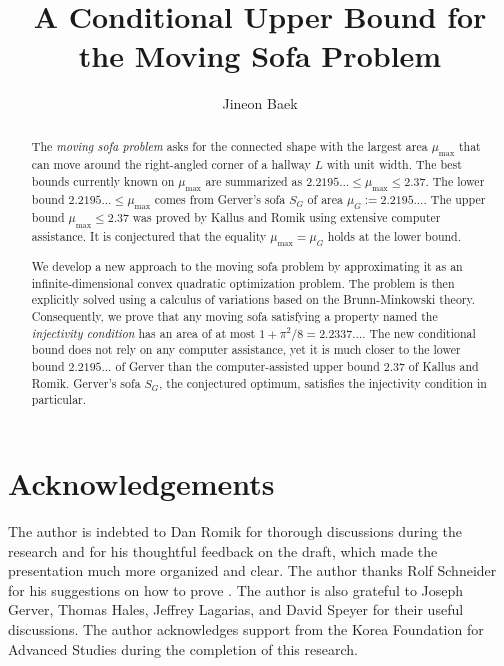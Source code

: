 \documentclass[10pt]{article}
\title{A Conditional Upper Bound for the Moving Sofa Problem}
\author{Jineon Baek}
\theoremstyle{plain}
\theoremstyle{definition}
\theoremstyle{remark}
\begin{document}
\maketitle

\begin{abstract}
The \emph{moving sofa problem} asks for the connected shape with the largest area $\mu_{\text{max}}$ that can move around the right-angled corner of a hallway $L$ with unit width. The best bounds currently known on $\mu_{\max}$ are summarized as $2.2195\ldots \leq \mu_{\max} \leq 2.37$. The lower bound $2.2195\ldots \leq \mu_{\max}$ comes from Gerver's sofa $S_G$ of area $\mu_G := 2.2195\ldots$. The upper bound $\mu_{\max} \leq 2.37$ was proved by Kallus and Romik using extensive computer assistance. It is conjectured that the equality $\mu_{\max} = \mu_G$ holds at the lower bound.

We develop a new approach to the moving sofa problem by approximating it as an infinite-dimensional convex quadratic optimization problem. The problem is then explicitly solved using a calculus of variations based on the Brunn-Minkowski theory. Consequently, we prove that any moving sofa satisfying a property named the \emph{injectivity condition} has an area of at most $1 + \pi^2/8 = 2.2337\dots$. The new conditional bound does not rely on any computer assistance, yet it is much closer to the lower bound $2.2195\ldots$ of Gerver than the computer-assisted upper bound $2.37$ of Kallus and Romik. Gerver's sofa $S_G$, the conjectured optimum, satisfies the injectivity condition in particular.
\end{abstract}

\tableofcontents



\section*{Acknowledgements}

The author is indebted to Dan Romik for thorough discussions during the research and for his thoughtful feedback on the draft, which made the presentation much more organized and clear. The author thanks Rolf Schneider for his suggestions on how to prove . The author is also grateful to Joseph Gerver, Thomas Hales, Jeffrey Lagarias, and David Speyer for their useful discussions. The author acknowledges support from the Korea Foundation for Advanced Studies during the completion of this research.
\printbibliography
\end{document}
